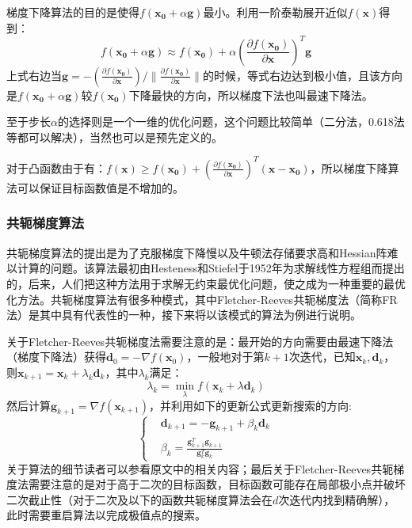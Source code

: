 梯度下降算法的目的是使得$f(\bm{x_0}+\alpha \bm{g})$最小。利用一阶泰勒展开近似$f(\bm{x})$得到：
\begin{equation}
\label{Gradient_Descend}
f(\bm{x_0}+\alpha \bm{g}) \approx f(\bm{x_0})+\alpha\left(\frac{\partial f(\bm{x_0})}{\partial \bm{x}}\right)^{T}\bm{g}
\end{equation}
上式右边当$\bm{g}=-\left(\frac{\partial f(\bm{x_0})}{\partial \bm{x}}\right)/\|\frac{\partial f(\bm{x_0})}{\partial \bm{x}}\|$的时候，等式右边达到极小值，且该方向是$f(\bm{x_0}+\alpha \bm{g})$较$f(\bm{x_0})$下降最快的方向，所以梯度下法也叫最速下降法。

至于步长$\alpha$的选择则是一个一维的优化问题，这个问题比较简单（二分法，0.618法等都可以解决），当然也可以是预先定义的。

对于凸函数由于有：$f(\bm{x})\geq f(\bm{x_0})+\left(\frac{\partial f(\bm{x_0})}{\partial \bm{x}}\right)^{T}(\bm{x-x_0})$，所以梯度下降算法可以保证目标函数值是不增加的。
\subsubsection{共轭梯度算法}
共轭梯度算法的提出是为了克服梯度下降慢以及牛顿法存储要求高和Hessian阵难以计算的问题。该算法最初由Hesteness和Stiefel于1952年为求解线性方程组而提出的，后来，人们把这种方法用于求解无约束最优化问题，使之成为一种重要的最优化方法。共轭梯度算法有很多种模式，其中Fletcher-Reeves共轭梯度法\cite{Conjugate_Gradient_FR}（简称FR法）是其中具有代表性的一种，接下来将以该模式的算法为例进行说明。

关于Fletcher-Reeves共轭梯度法需要注意的是：最开始的方向需要由最速下降法（梯度下降法）获得$\bm{d}_0=-\nabla f(\bm{x}_0)$，一般地对于第$k+1$次迭代，已知$\bm{x}_k,\bm{d}_k$，则$\bm{x}_{k+1}=\bm{x}_{k}+\lambda_{k}\bm{d}_{k}$，其中$\lambda_k$满足：
\begin{equation}
\label{linear_search}
\lambda_{k}=\min_{\lambda} f(\bm{x}_k+\lambda \bm{d}_{k})
\end{equation}
然后计算$\bm{g}_{k+1}=\nabla f(\bm{x}_{k+1})$，并利用如下的更新公式更新搜索的方向\cite{Conjugate_Gradient_FR}:
\begin{equation}
\label{Conjugate_Gradeint_update}
\left\{
\begin{split}
&\bm{d}_{k+1}=-\bm{g}_{k+1}+\beta_{k}\bm{d}_{k}\\
&\beta_{k}=\frac{\bm{g}_{k+1}^{T}\bm{g}_{k+1}}{\bm{g}_{k}^{T}\bm{g}_{k}}
\end{split}
\right.
\end{equation}
关于算法的细节读者可以参看原文\cite{Conjugate_Gradient_FR}中的相关内容；最后关于Fletcher-Reeves共轭梯度法需要注意的是对于高于二次的目标函数，目标函数可能存在局部极小点并破坏二次截止性（对于二次及以下的函数共轭梯度算法会在$d$次迭代内找到精确解），此时需要重启算法以完成极值点的搜索。
